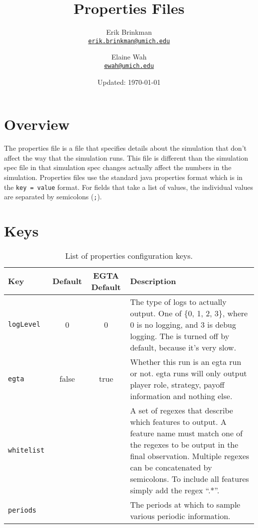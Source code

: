 \documentclass{article}
\newcommand{\email}[1]{\href{mailto:#1}{\texttt{#1}}}
\begin{document}
	
\title{Properties Files}
\author{
  Erik Brinkman \\
  \email{erik.brinkman@umich.edu}
  \and
  Elaine Wah \\
  \email{ewah@umich.edu}
}
\date{Updated: \today}
\maketitle

\section{Overview}

The properties file is a file that specifies details about the simulation that
don't affect the way that the simulation runs. This file is different than the
simulation spec file in that simulation spec changes actually affect the
numbers in the simulation. Properties files use the standard java properties
format which is in the \texttt{key = value} format. For fields that take a list
of values, the individual values are separated by semicolons (\texttt{;}).

\section{Keys}

\begin{table}
\centering
\begin{tabulary}{\textwidth}{lccL}\toprule
\textbf{Key} & \textbf{Default} & \textbf{EGTA Default} & \textbf{Description} \\ \midrule
\texttt{logLevel} & 0 & 0 & The type of logs to actually output. One of \{0, 1, 2, 3\},
where 0 is no logging, and 3 is debug logging. The is turned off by default,
because it's very slow.\\
\texttt{egta} & false & true & Whether this run is an egta run or not. egta
runs will only output player role, strategy, payoff information and nothing
else. \\
\texttt{whitelist} & & & A set of regexes that describe which features to
output. A feature name must match one of the regexes to be output in the final
observation. Multiple regexes can be concatenated by semicolons. To include all
features simply add the regex ``.*''. \\
\texttt{periods} & & & The periods at which to sample various periodic
information. \\
\bottomrule
\end{tabulary}
\caption{List of properties configuration keys.}
\label{tab:props}
\end{table}
\end{document}
